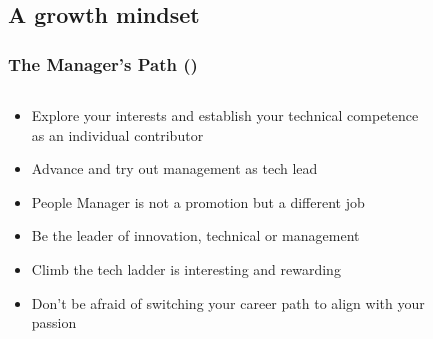 \documentclass[aspectratio=169,xcolor=x11names,table]{beamer}
\begin{document}

\subsection{A growth mindset}

\begin{frame}
	\frametitle{The Manager's Path (\cite{fournier2017manager})}
	\begin{columns}
		\begin{column}{0.7\linewidth}
			\begin{itemize}
				\item Explore your interests and establish your technical competence as an individual contributor
					\vspace{5mm}
				\item Advance and try out management as tech lead
				\item People Manager is not a promotion but a different job
					\vspace{5mm}
				\item Be the leader of innovation, technical or management
				\item Climb the tech ladder is interesting and rewarding
					\vspace{5mm}
				\item Don't be afraid of switching your career path to align with your passion
			\end{itemize}
		\end{column}
		\hfill
		\begin{column}{0.3\linewidth}
			\begin{figure}
				\centering

\end{figure}
\end{column}
\end{columns}
\end{frame}
\end{document}
